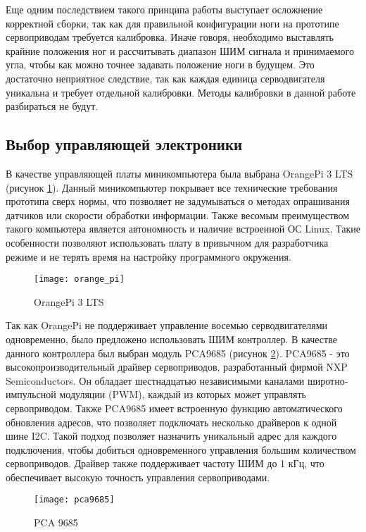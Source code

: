 Еще одним последствием такого принципа работы выступает осложнение корректной сборки, так как для правильной конфигурации ноги на прототипе сервоприводам требуется калибровка. Иначе говоря, необходимо выставлять крайние положения ног и рассчитывать диапазон ШИМ сигнала и принимаемого угла, чтобы как можно точнее задавать положение ноги в будущем. Это достаточно неприятное следствие, так как каждая единица серводвигателя уникальна и требует отдельной калибровки. Методы калибровки в данной работе разбираться не будут.

\subsection{Выбор управляющей электроники}\label{C4_4_2}
	
В качестве управляющей платы миникомпьютера была выбрана OrangePi 3 LTS (рисунок \ref{orange_pi}). Данный миникомпьютер покрывает все технические требования прототипа сверх нормы, что позволяет не задумываться о методах опрашивания датчиков или скорости обработки информации. Также весомым преимуществом такого компьютера является автономность и наличие встроенной ОС Linux. Такие особенности позволяют использовать плату в привычном для разработчика режиме и не терять время на настройку программного окружения. 	
\begin{figure}[h!]
	\begin{center}
		\texttt{[image: orange\_pi]}
		\caption{OrangePi 3 LTS}
		\label{orange_pi}
	\end{center}
\end{figure}

Так как OrangePi не поддерживает управление восемью серводвигателями одновременно, было предложено использовать ШИМ контроллер. В качестве данного контроллера был выбран модуль PCA9685 (рисунок \ref{pca9685}). PCA9685 - это высокопроизводительный драйвер сервоприводов, разработанный фирмой NXP Semiconductors. Он обладает шестнадцатью независимыми каналами широтно-импульсной модуляции (PWM), каждый из которых может управлять сервоприводом. Также PCA9685 имеет встроенную функцию автоматического обновления адресов, что позволяет подключать несколько драйверов к одной шине I2C. Такой подход позволяет назначить уникальный адрес для каждого подключения, чтобы добиться одновременного управления большим количеством сервоприводов. Драйвер также поддерживает частоту ШИМ до 1 кГц, что обеспечивает высокую точность управления сервоприводами.

\begin{figure}[h!]
	\begin{center}
		\texttt{[image: pca9685]}
		\caption{PCA 9685}
		\label{pca9685}
	\end{center}
\end{figure}

